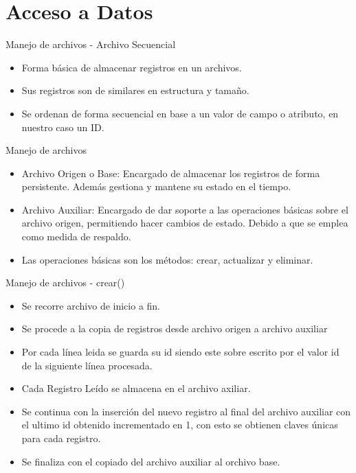 \section{Acceso a Datos}

\begin{frame}{Manejo de archivos - Archivo Secuencial}
	\begin{block}{}
	\begin{itemize}
		\item Forma básica de almacenar registros en un archivos.
		\item Sus registros son de similares en estructura y tama\~no.
		\item Se ordenan de forma secuencial en base a un valor de campo o atributo, en nuestro caso un ID.
	\end{itemize}
\end{block}
\end{frame}


\begin{frame}{Manejo de archivos}
	\begin{itemize}
\item Archivo Origen o Base: Encargado de almacenar los registros de forma persistente. Adem\'as gestiona y mantene su estado en el tiempo.
\item Archivo Auxiliar:  Encargado de dar soporte a las operaciones b\'asicas sobre el archivo origen, permitiendo hacer cambios de estado. Debido a que se emplea como medida de respaldo.
\item Las operaciones b\'asicas son los m\'etodos: crear, actualizar y eliminar.
\end{itemize}
\end{frame}

\begin{frame}{Manejo de archivos - crear()}
	\begin{itemize}
\item Se recorre archivo de inicio a fin.
\item Se procede a la copia de registros desde archivo origen a archivo auxiliar
\item Por cada l\'inea leida se guarda su id siendo este sobre escrito por el valor id de la siguiente l\'inea procesada.
\item Cada Registro Le\'ido se almacena en el archivo axiliar.
\item Se continua con la inserci\'on del nuevo registro al final del archivo auxiliar con el ultimo id obtenido incrementado en 1, con esto se obtienen claves \'unicas para cada registro.
\item Se finaliza con el copiado del archivo auxiliar al orchivo base.
\end{itemize}
\end{frame}


